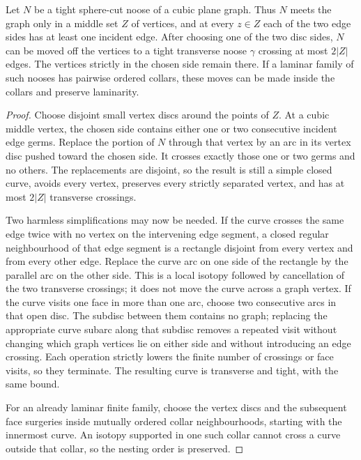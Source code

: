 \begin{lemma}
\label{lem:cubic-noose-edge-perturbation}
\Sprose
Let \(N\) be a tight sphere-cut noose of a cubic plane graph.  Thus \(N\)
meets the graph only in a middle set \(Z\) of vertices, and at every
\(z\in Z\) each of the two edge sides has at least one incident edge.
After choosing one of the two disc sides, \(N\) can be moved off the
vertices to a tight transverse noose \(\gamma\) crossing at most
\(2|Z|\) edges.  The vertices strictly in the chosen side remain there.
If a laminar family of such nooses has pairwise ordered collars, these moves
can be made inside the collars and preserve laminarity.
\end{lemma}

\begin{proof}
Choose disjoint small vertex discs around the points of \(Z\).  At a cubic
middle vertex, the chosen side contains either one or two consecutive
incident edge germs.  Replace the portion of \(N\) through that vertex by
an arc in its vertex disc pushed toward the chosen side.  It crosses exactly
those one or two germs and no others.  The replacements are disjoint, so the
result is still a simple closed curve, avoids every vertex, preserves every
strictly separated vertex, and has at most \(2|Z|\) transverse crossings.

Two harmless simplifications may now be needed.  If the curve crosses the
same edge twice with no vertex on the intervening edge segment, a
closed regular neighbourhood of that edge segment is a rectangle disjoint
from every vertex and from every other edge.  Replace the curve arc on one
side of the rectangle by the parallel arc on the other side.  This is a
local isotopy followed by cancellation of the two transverse crossings; it
does not move the curve across a graph vertex.  If the curve visits
one face in more than one arc, choose two consecutive arcs in that open
disc.  The subdisc between them contains no graph; replacing the appropriate
curve subarc along that subdisc removes a repeated visit without changing
which graph vertices lie on either side and without introducing an edge
crossing.  Each operation strictly lowers the finite number of crossings or
face visits, so they terminate.  The resulting curve is transverse and
tight, with the same bound.

For an already laminar finite family, choose the vertex discs and the
subsequent face surgeries inside mutually ordered collar neighbourhoods,
starting with the innermost curve.  An isotopy supported in one such collar
cannot cross a curve outside that collar, so the nesting order is preserved.
\end{proof}

